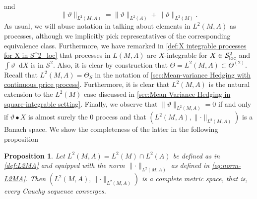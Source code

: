 \documentclass[11pt,a4paper,twoside,openany]{report}
\newcommand{\diff}{\mathop{}\!\mathrm{d}}
\theoremstyle{plain} %
\newtheorem{proposition}[proposition]{Proposition}
\theoremstyle{definition} %
\theoremstyle{remark} %
\begin{document}
and \begin{equation}\label{eq:norm-L2MA}
    \lVert \vartheta\rVert_{L^2(M,A)}=\lVert \vartheta\rVert_{L^2(A)}+\lVert \vartheta\rVert_{L^2(M)}.
\end{equation}
As usual, we will abuse notation in talking about elements in \(L^2(M,A)\) as processes, although we implicitly pick representatives of the corresponding equivalence class.
 Furthermore, we have remarked in \cref{def:X integrable processes for X in S^2_loc} that processes in \(L(M,A)\) are \(X\)-integrable for \(X\in\mathcal{S}^2_{\rm{\rm{loc}}}\) and  \(\int \vartheta\diff X\) is in \(\mathcal{S}^2\). Also, it is clear by construction that 
\(\Theta=L^2(M,A)\subset \Theta^{(2)}\). 
Recall that \(L^2(M,A)=\Theta_S\) in the notation of \cref{sec:Mean-variance Hedging with continuous price process}. Furthermore, it is clear that \(L^2(M,A)\) is the natural extension to the \(L^2(M)\) case discussed in \cref{sec:Mean Variance Hedging in square-integrable setting}. Finally, we observe that \(\lVert\vartheta\rVert_{L^2(M,A)}=0\) if and only if \(\vartheta\bullet X\) is almost surely the \(0\) process and that \((L^2(M,A),\lVert\cdot\rVert_{L^2(M,A)})\) is a Banach space. We show the completeness of the latter in the following proposition
\begin{proposition}
    Let \(L^2(M,A)=L^2(M)\cap L^2(A)\) be defined as in \cref{def:L2MA} and equipped with the norm \(\lVert\cdot\rVert_{L^2(M,A)}\) as defined in \cref{eq:norm-L2MA}. Then \((L^2(M,A),\lVert\cdot\rVert_{L^2(M,A)})\) is a complete metric space, that is, every Cauchy sequence converges.
\end{proposition}
\end{document}
